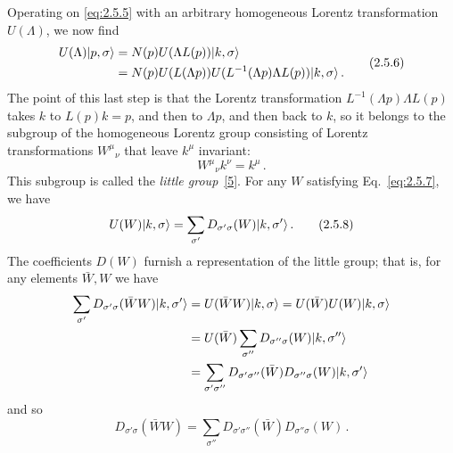 Operating on \eqref{eq:2.5.5} with an arbitrary homogeneous Lorentz transformation
$U(\Lambda)$, we now find
\begin{equation}
\begin{aligned}
U(\Lambda)\lvert p,\sigma\rangle
&=N(p)U(\Lambda L(p))\lvert k,\sigma\rangle\\
&=N(p)U(L(\Lambda p))
U(L^{-1}(\Lambda p)\Lambda L(p))\lvert k,\sigma\rangle\,.
\end{aligned}
\tag{2.5.6}\label{eq:2.5.6}
\end{equation}
The point of this last step is that the Lorentz transformation
$L^{-1}(\Lambda p)\Lambda L(p)$ takes $k$ to $L(p)k=p$, and then to
$\Lambda p$, and then back to $k$, so it belongs to the subgroup of the
homogeneous Lorentz group consisting of Lorentz transformations
$W^\mu{}_{\nu}$ that leave $k^\mu$ invariant:
\begin{equation}
W^\mu{}_{\nu}k^\nu=k^\mu\,.
\tag{2.5.7}\label{eq:2.5.7}
\end{equation}
This subgroup is called the \emph{little group}~\hyperref[ref:2.5]{[5]}. For any
$W$ satisfying Eq.~\eqref{eq:2.5.7}, we have
\begin{equation}
U(W)\lvert k,\sigma\rangle
=\sum_{\sigma'}D_{\sigma'\sigma}(W)\lvert k,\sigma'\rangle\,.
\tag{2.5.8}\label{eq:2.5.8}
\end{equation}
The coefficients $D(W)$ furnish a representation of the little group; that is,
for any elements $\bar W,W$ we have
\[
\begin{aligned}
\sum_{\sigma'}D_{\sigma'\sigma}(\bar W W)\lvert k,\sigma'\rangle
&=U(\bar W W)\lvert k,\sigma\rangle=U(\bar W)U(W)\lvert k,\sigma\rangle\\
&=U(\bar W)\sum_{\sigma''}D_{\sigma''\sigma}(W)\lvert k,\sigma''\rangle\\
&=\sum_{\sigma'\sigma''}D_{\sigma'\sigma''}(\bar W)
D_{\sigma''\sigma}(W)\lvert k,\sigma'\rangle
\end{aligned}
\]
and so
\begin{equation}
D_{\sigma'\sigma}(\bar W W)
=\sum_{\sigma''}D_{\sigma'\sigma''}(\bar W)D_{\sigma''\sigma}(W)\,.
\tag{2.5.9}\label{eq:2.5.9}
\end{equation}

